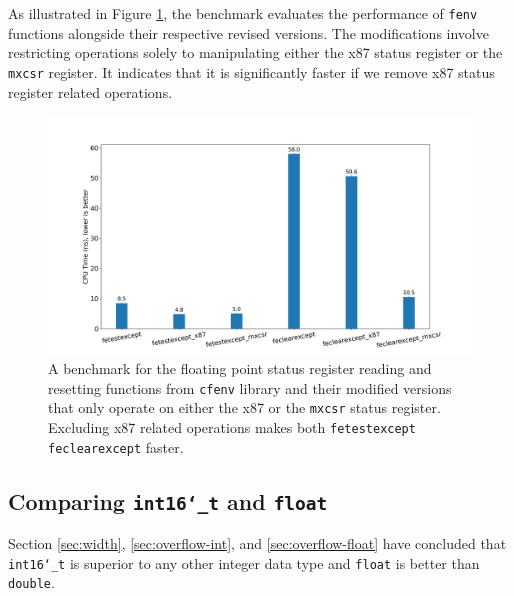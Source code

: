 \documentclass[logo,bsc,singlespacing,parskip]{infthesis}
\newcommand{\dtshort}{\texttt{int16\char`_t}}
\newcommand{\dtfloat}{\texttt{float}}
\newcommand{\dtdouble}{\texttt{double}}
\newcommand{\mxcsr}{\texttt{mxcsr}}
\newcommand{\xmm}{\texttt{XMM}}
\begin{document}

As illustrated in Figure \ref{plot_fenv}, the benchmark evaluates the
performance of \texttt{fenv} functions alongside their respective revised
versions. The modifications involve restricting operations solely to
manipulating either the x87 status register or the \mxcsr{} register. It
indicates that it is significantly faster if we remove x87 status register
related operations. 

\begin{figure}[H]\captionsetup{name=Figure}
    \begin{center}
    \includegraphics[width=\linewidth]{image/bench_fenv.png}
    \end{center}
    \caption{A benchmark for the floating point status register reading and
resetting functions from \texttt{cfenv} library and their modified versions that
only operate on either the x87 or the \mxcsr{} status register. Excluding x87
related operations makes both \texttt{fetestexcept} \texttt{feclearexcept}
faster.}
    \label{plot_fenv}
\end{figure}
\normalsize

\subsection{Comparing \dtshort{} and \dtfloat{}}

Section \ref{sec:width}, \ref{sec:overflow-int}, and \ref{sec:overflow-float}
have concluded that \dtshort{} is superior to any other integer data type and
\dtfloat{} is better than \dtdouble{}. 

\end{document}
